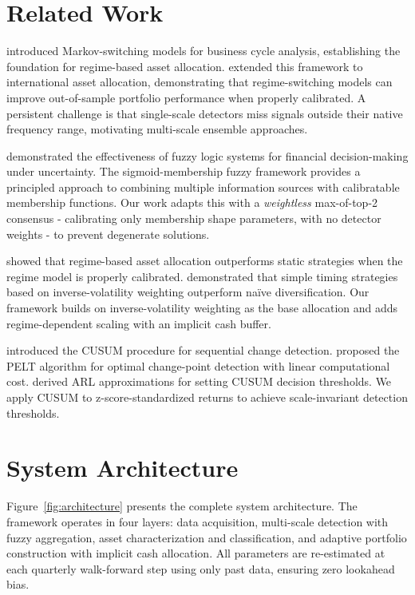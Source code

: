 \documentclass[11pt]{article}
\begin{document}
\section{Related Work}

\citet{hamilton1989} introduced Markov-switching models for business
cycle analysis, establishing the foundation for regime-based asset
allocation.  \citet{ang2002} extended this framework to international
asset allocation, demonstrating that regime-switching models can
improve out-of-sample portfolio performance when properly calibrated.
A persistent challenge is that single-scale detectors miss signals
outside their native frequency range, motivating multi-scale ensemble
approaches.

\citet{gradojevic2013} demonstrated the effectiveness of fuzzy logic
systems for financial decision-making under uncertainty.  The
sigmoid-membership fuzzy framework \citep{takagi1985} provides a
principled approach to combining multiple information sources with
calibratable membership functions.  Our work adapts this with a
\emph{weightless} max-of-top-2 consensus - calibrating only membership
shape parameters, with no detector weights - to
prevent degenerate solutions.

\citet{nystrup2017} showed that regime-based asset allocation
outperforms static strategies when the regime model is properly
calibrated.  \citet{kirby2012} demonstrated that simple timing
strategies based on inverse-volatility weighting outperform na\"ive
diversification.  Our framework builds on inverse-volatility weighting
as the base allocation and adds regime-dependent scaling with an
implicit cash buffer.

\citet{page1954} introduced the CUSUM procedure for sequential change
detection.  \citet{killick2012} proposed the PELT algorithm for
optimal change-point detection with linear computational cost.
\citet{siegmund1985} derived ARL approximations for setting CUSUM
decision thresholds.  We apply CUSUM to z-score-standardized returns
to achieve scale-invariant detection thresholds.

\section{System Architecture}

Figure~\ref{fig:architecture} presents the complete system architecture.
The framework operates in four layers: data acquisition, multi-scale
detection with fuzzy aggregation, asset characterization and
classification, and adaptive portfolio construction with implicit cash
allocation.  All parameters are re-estimated at each quarterly
walk-forward step using only past data, ensuring zero lookahead bias.
\end{document}
